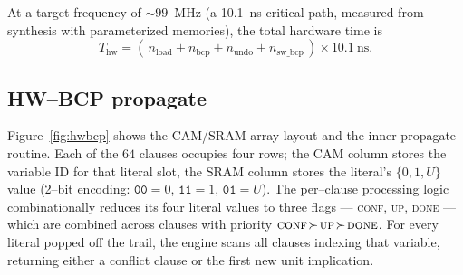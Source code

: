 \documentclass[11pt,letterpaper]{article}
\begin{document}
\noindent
At a target frequency of $\sim 99$~MHz (a 10.1~ns critical path,
measured from synthesis with parameterized memories), the total
hardware time is
\[
T_{\mathrm{hw}} = (\,n_{\mathrm{load}} + n_{\mathrm{bcp}} + n_{\mathrm{undo}} +
n_{\mathrm{sw\_bcp}}\,)\times 10.1~\mathrm{ns}.
\]

\subsection{HW--BCP propagate}
Figure~\ref{fig:hwbcp} shows the CAM/SRAM array layout and the
inner propagate routine. Each of the $64$ clauses occupies four
rows; the CAM column stores the variable ID for that literal slot,
the SRAM column stores the literal's $\{0,1,U\}$ value
(2--bit encoding: $\mathtt{00}{=}0$, $\mathtt{11}{=}1$,
$\mathtt{01}{=}U$). The per--clause processing logic
combinationally reduces its four literal values to three flags ---
\textsc{conf}, \textsc{up}, \textsc{done} --- which are combined
across clauses with priority $\textsc{conf}\!\succ\!\textsc{up}\!\succ\!\textsc{done}$.
For every literal popped off the trail, the engine scans all
clauses indexing that variable, returning either a conflict clause
or the first new unit implication.
\end{document}
